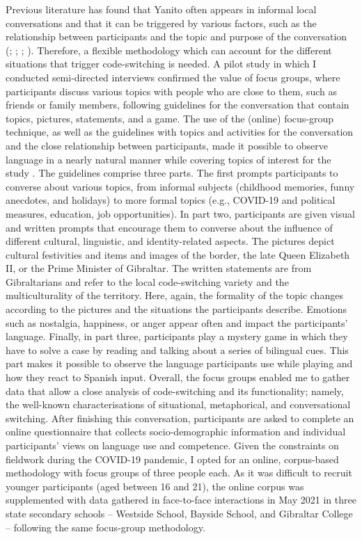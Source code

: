 \documentclass[output=paper]{langscibook}
\begin{document}
Previous literature has found that Yanito often appears in informal local conversations and that it can be triggered by various factors, such as the relationship between participants and the topic and purpose of the conversation (\citealt{moyer_analysis_1993}; \citealt{kellermann_new_2001}; \citealt{levey_language_2008}; \citealt{weston_code-switching_2013}). Therefore, a flexible methodology which can account for the different situations that trigger code-switching is needed. A pilot study in which I conducted semi-directed interviews confirmed the value of focus groups, where participants discuss various topics with people who are close to them, such as friends or family members, following guidelines for the conversation that contain topics, pictures, statements, and a game. The use of the (online) focus-group technique, as well as the guidelines with topics and activities for the conversation and the close relationship between participants, made it possible to observe language in a nearly natural manner while covering topics of interest for the study \citep{labov_field_1984}. The guidelines comprise three parts. The first prompts participants to converse about various topics, from informal subjects (childhood memories, funny anecdotes, and holidays) to more formal topics (e.g., COVID-19 and political measures, education, job opportunities). In part two, participants are given visual and written prompts that encourage them to converse about the influence of different cultural, linguistic, and identity-related aspects. The pictures depict cultural festivities and items and images of the border, the late Queen Elizabeth II, or the Prime Minister of Gibraltar. The written statements are from Gibraltarians and refer to the local code-switching variety and the multiculturality of the territory. Here, again, the formality of the topic changes according to the pictures and the situations the participants describe. Emotions such as nostalgia, happiness, or anger appear often and impact the participants’ language. Finally, in part three, participants play a mystery game in which they have to solve a case by reading and talking about a series of bilingual cues. This part makes it possible to observe the language participants use while playing and how they react to Spanish input. Overall, the focus groups enabled me to gather data that allow a close analysis of code-switching and its functionality; namely, the well-known characterisations of situational, metaphorical, and conversational switching. After finishing this conversation, participants are asked to complete an online questionnaire that collects socio-demographic information and individual participants’ views on language use and competence. Given the constraints on fieldwork during the COVID-19 pandemic, I opted for an online, corpus-based methodology with focus groups of three people each. As it was difficult to recruit younger participants (aged between 16 and 21), the online corpus was supplemented with data gathered in face-to-face interactions in May 2021 in three state secondary schools – Westside School, Bayside School, and Gibraltar College – following the same focus-group methodology.
\end{document}
